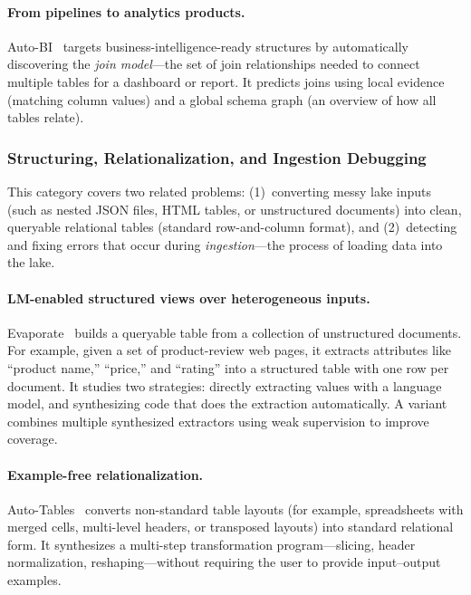 \documentclass[sigconf]{acmart}
\begin{document}
\paragraph{From pipelines to analytics products.}
Auto-BI~\cite{10.14778/3603581.3603596} targets business-intelligence-ready structures by automatically discovering the \emph{join model}---the set of join relationships needed to connect multiple tables for a dashboard or report. It predicts joins using local evidence (matching column values) and a global schema graph (an overview of how all tables relate).



\subsubsection{Structuring, Relationalization, and Ingestion Debugging}
This category covers two related problems: (1)~converting messy lake inputs (such as nested JSON files, HTML tables, or unstructured documents) into clean, queryable relational tables (standard row-and-column format), and (2)~detecting and fixing errors that occur during \emph{ingestion}---the process of loading data into the lake.

\paragraph{LM-enabled structured views over heterogeneous inputs.}
Evaporate~\cite{10.14778/3626292.3626294} builds a queryable table from a collection of unstructured documents. For example, given a set of product-review web pages, it extracts attributes like ``product name,'' ``price,'' and ``rating'' into a structured table with one row per document. It studies two strategies: directly extracting values with a language model, and synthesizing code that does the extraction automatically. A variant combines multiple synthesized extractors using weak supervision to improve coverage.

\paragraph{Example-free relationalization.}
Auto-Tables~\cite{10.1145/3665252.3665269} converts non-standard table layouts (for example, spreadsheets with merged cells, multi-level headers, or transposed layouts) into standard relational form. It synthesizes a multi-step transformation program---slicing, header normalization, reshaping---without requiring the user to provide input--output examples.
\end{document}
